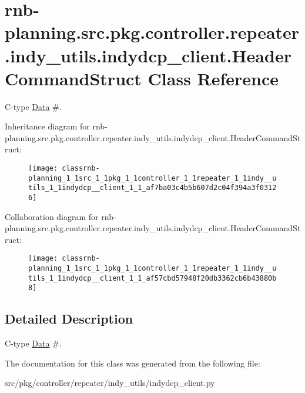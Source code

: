 \hypertarget{classrnb-planning_1_1src_1_1pkg_1_1controller_1_1repeater_1_1indy__utils_1_1indydcp__client_1_1_header_command_struct}{}\section{rnb-\/planning.src.\+pkg.\+controller.\+repeater.\+indy\+\_\+utils.\+indydcp\+\_\+client.\+Header\+Command\+Struct Class Reference}
\label{classrnb-planning_1_1src_1_1pkg_1_1controller_1_1repeater_1_1indy__utils_1_1indydcp__client_1_1_header_command_struct}


C-\/type \hyperlink{classrnb-planning_1_1src_1_1pkg_1_1controller_1_1repeater_1_1indy__utils_1_1indydcp__client_1_1_data}{Data} \#.  




Inheritance diagram for rnb-\/planning.src.\+pkg.\+controller.\+repeater.\+indy\+\_\+utils.\+indydcp\+\_\+client.\+Header\+Command\+Struct\+:
\nopagebreak
\begin{figure}[H]
\begin{center}
\leavevmode
\texttt{[image: classrnb-planning\_1\_1src\_1\_1pkg\_1\_1controller\_1\_1repeater\_1\_1indy\_\_utils\_1\_1indydcp\_\_client\_1\_1\_af7ba03c4b5b607d2c04f394a3f03126]}
\end{center}
\end{figure}


Collaboration diagram for rnb-\/planning.src.\+pkg.\+controller.\+repeater.\+indy\+\_\+utils.\+indydcp\+\_\+client.\+Header\+Command\+Struct\+:
\nopagebreak
\begin{figure}[H]
\begin{center}
\leavevmode
\texttt{[image: classrnb-planning\_1\_1src\_1\_1pkg\_1\_1controller\_1\_1repeater\_1\_1indy\_\_utils\_1\_1indydcp\_\_client\_1\_1\_af57cbd57948f20db3362cb6b43880b8]}
\end{center}
\end{figure}


\subsection{Detailed Description}
C-\/type \hyperlink{classrnb-planning_1_1src_1_1pkg_1_1controller_1_1repeater_1_1indy__utils_1_1indydcp__client_1_1_data}{Data} \#. 

The documentation for this class was generated from the following file\+:\begin{DoxyCompactItemize}
\item 
src/pkg/controller/repeater/indy\+\_\+utils/indydcp\+\_\+client.\+py\end{DoxyCompactItemize}
